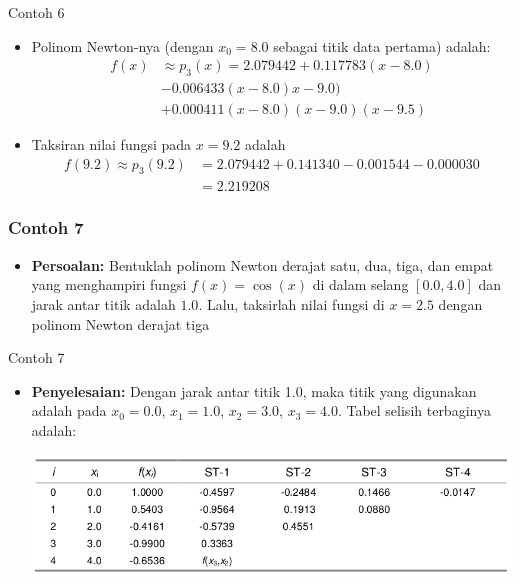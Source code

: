 \documentclass[pdflatex,compress,mathserif]{beamer}
\begin{document}
\begin{frame}{Contoh 6}
	\begin{itemize}
		\item Polinom Newton-nya (dengan $ x_0 = 8.0 $ sebagai titik data pertama) adalah:
		\begin{align*}
			f(x) &\approx p_3(x) = 2.079442 + 0.117783(x - 8.0)\\
			&- 0.006433(x - 8.0)x - 9.0) \\
			&+ 0.000411(x - 8.0)(x - 9.0)(x - 9.5)
		\end{align*}
		\item Taksiran nilai fungsi pada $ x = 9.2 $ adalah
		\begin{align*}
			f(9.2) \approx p_3(9.2) &= 2.079442 + 0.141340 - 0.001544 - 0.000030 \\
			&= 2.219208
		\end{align*}
	\end{itemize}
\end{frame}

\begin{frame}
	\frametitle{Contoh 7}
	\begin{itemize}
		\item \textbf{Persoalan:} Bentuklah polinom Newton derajat satu, dua, tiga, dan empat yang menghampiri fungsi $ f(x) = \cos(x) $ di dalam selang $ [0.0 , 4.0] $ dan jarak antar titik adalah $ 1.0 $. Lalu, taksirlah nilai fungsi di $ x = 2.5 $ dengan polinom Newton derajat tiga
	\end{itemize}
\end{frame}

\begin{frame}{Contoh 7}
	\begin{itemize}
		\item \textbf{Penyelesaian:} Dengan jarak antar titik 1.0, maka titik yang digunakan adalah pada $ x_0 = 0.0 $, $ x_1 = 1.0 $, $ x_2 = 3.0 $, $ x_3 = 4.0 $. Tabel selisih terbaginya adalah:
		\begin{center}
			\includegraphics[width=\linewidth]{img/img14}
		\end{center}
	\end{itemize}
\end{frame}
\end{document}
